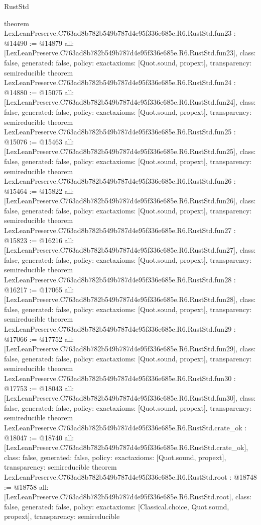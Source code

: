 \begin{lexlean}{RustStd}
\begin{coremodule}
{}
theorem LexLeanPreserve.C763ad8b782b549b787d4e95f336e685e.R6.RustStd.fun23 : @14490 := @14879 {
  all: [LexLeanPreserve.C763ad8b782b549b787d4e95f336e685e.R6.RustStd.fun23],
  class: false,
  generated: false,
  policy: exact{axioms: [Quot.sound, propext]},
  transparency: semireducible
}
theorem LexLeanPreserve.C763ad8b782b549b787d4e95f336e685e.R6.RustStd.fun24 : @14880 := @15075 {
  all: [LexLeanPreserve.C763ad8b782b549b787d4e95f336e685e.R6.RustStd.fun24],
  class: false,
  generated: false,
  policy: exact{axioms: [Quot.sound, propext]},
  transparency: semireducible
}
theorem LexLeanPreserve.C763ad8b782b549b787d4e95f336e685e.R6.RustStd.fun25 : @15076 := @15463 {
  all: [LexLeanPreserve.C763ad8b782b549b787d4e95f336e685e.R6.RustStd.fun25],
  class: false,
  generated: false,
  policy: exact{axioms: [Quot.sound, propext]},
  transparency: semireducible
}
theorem LexLeanPreserve.C763ad8b782b549b787d4e95f336e685e.R6.RustStd.fun26 : @15464 := @15822 {
  all: [LexLeanPreserve.C763ad8b782b549b787d4e95f336e685e.R6.RustStd.fun26],
  class: false,
  generated: false,
  policy: exact{axioms: [Quot.sound, propext]},
  transparency: semireducible
}
theorem LexLeanPreserve.C763ad8b782b549b787d4e95f336e685e.R6.RustStd.fun27 : @15823 := @16216 {
  all: [LexLeanPreserve.C763ad8b782b549b787d4e95f336e685e.R6.RustStd.fun27],
  class: false,
  generated: false,
  policy: exact{axioms: [Quot.sound, propext]},
  transparency: semireducible
}
theorem LexLeanPreserve.C763ad8b782b549b787d4e95f336e685e.R6.RustStd.fun28 : @16217 := @17065 {
  all: [LexLeanPreserve.C763ad8b782b549b787d4e95f336e685e.R6.RustStd.fun28],
  class: false,
  generated: false,
  policy: exact{axioms: [Quot.sound, propext]},
  transparency: semireducible
}
theorem LexLeanPreserve.C763ad8b782b549b787d4e95f336e685e.R6.RustStd.fun29 : @17066 := @17752 {
  all: [LexLeanPreserve.C763ad8b782b549b787d4e95f336e685e.R6.RustStd.fun29],
  class: false,
  generated: false,
  policy: exact{axioms: [Quot.sound, propext]},
  transparency: semireducible
}
theorem LexLeanPreserve.C763ad8b782b549b787d4e95f336e685e.R6.RustStd.fun30 : @17753 := @18043 {
  all: [LexLeanPreserve.C763ad8b782b549b787d4e95f336e685e.R6.RustStd.fun30],
  class: false,
  generated: false,
  policy: exact{axioms: [Quot.sound, propext]},
  transparency: semireducible
}
theorem LexLeanPreserve.C763ad8b782b549b787d4e95f336e685e.R6.RustStd.crate_ok : @18047 := @18740 {
  all: [LexLeanPreserve.C763ad8b782b549b787d4e95f336e685e.R6.RustStd.crate_ok],
  class: false,
  generated: false,
  policy: exact{axioms: [Quot.sound, propext]},
  transparency: semireducible
}
theorem LexLeanPreserve.C763ad8b782b549b787d4e95f336e685e.R6.RustStd.root : @18748 := @18758 {
  all: [LexLeanPreserve.C763ad8b782b549b787d4e95f336e685e.R6.RustStd.root],
  class: false,
  generated: false,
  policy: exact{axioms: [Classical.choice, Quot.sound, propext]},
  transparency: semireducible
}


\end{coremodule}
\end{lexlean}
